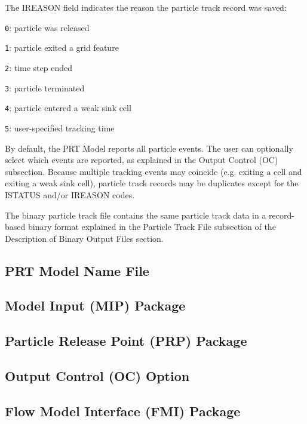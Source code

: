 The IREASON field indicates the reason the particle track record was saved:

\begin{description} \itemsep0pt \parskip0pt 
\item \texttt{0}: particle was released
\item \texttt{1}: particle exited a grid feature
\item \texttt{2}: time step ended
\item \texttt{3}: particle terminated
\item \texttt{4}: particle entered a weak sink cell
\item \texttt{5}: user-specified tracking time
\end{description}

By default, the PRT Model reports all particle events. The user can optionally select which events are reported, as explained in the Output Control (OC) subsection. Because multiple tracking events may coincide (e.g. exiting a cell and exiting a weak sink cell), particle track records may be duplicates except for the ISTATUS and/or IREASON codes.

The binary particle track file contains the same particle track data in a record-based binary format explained in the Particle Track File subsection of the Description of Binary Output Files section.



\newpage
\subsection{PRT Model Name File}


%

%

%

\newpage
\subsection{Model Input (MIP) Package}


\newpage
\subsection{Particle Release Point (PRP) Package}


\newpage
\subsection{Output Control (OC) Option}


\newpage
\subsection{Flow Model Interface (FMI) Package}


